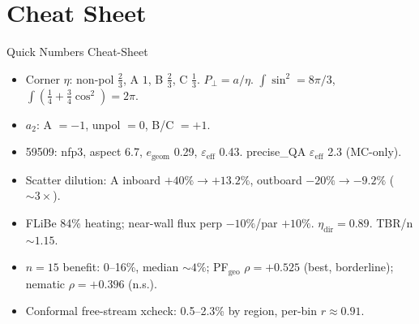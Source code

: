 \documentclass[11pt,aspectratio=169]{beamer}
\begin{document}
\section{Cheat Sheet}
\begin{frame}{Quick Numbers Cheat-Sheet}
\small
\begin{itemize}
\item Corner $\eta$: non-pol $\tfrac23$, A $1$, B $\tfrac23$, C $\tfrac13$. $P_\perp = a/\eta$.
      $\int\sin^2 = 8\pi/3$, $\int(\tfrac14 + \tfrac34\cos^2) = 2\pi$.
\item $a_2$: A $= -1$, unpol $= 0$, B/C $= +1$.
\item 59509: nfp3, aspect 6.7, $e_{\text{geom}}$ 0.29, $\varepsilon_{\mathrm{eff}}$ 0.43.
      precise\_QA $\varepsilon_{\mathrm{eff}}$ 2.3 (MC-only).
\item Scatter dilution: A inboard $+40\% \to +13.2\%$, outboard $-20\% \to -9.2\%$
      ($\sim 3\times$).
\item FLiBe 84\% heating; near-wall flux perp $-10\%$/par $+10\%$. $\eta_{\text{dir}} = 0.89$.
      TBR/n $\sim 1.15$.
\item $n=15$ benefit: 0--16\%, median $\sim 4\%$; PF$_{\mathrm{geo}}$ $\rho = +0.525$ (best,
      borderline); nematic $\rho = +0.396$ (n.s.).
\item Conformal free-stream xcheck: 0.5--2.3\% by region, per-bin $r \approx 0.91$.
\end{itemize}
\end{frame}
\end{document}
